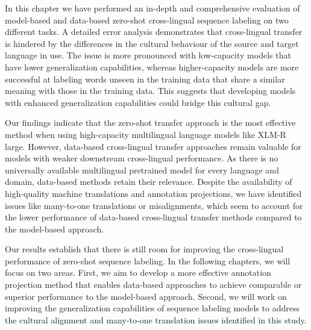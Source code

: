 In this chapter we have performed an in-depth and comprehensive evaluation of model-based and data-based zero-shot cross-lingual sequence labeling on two different tasks. A detailed error analysis demonstrates that cross-lingual transfer is hindered by the differences in the cultural behaviour of the source and target language in use. The issue is more pronounced with low-capacity models that have lower generalization capabilities, whereas higher-capacity models are more successful at labeling words unseen in the training data that share a similar meaning with those in the training data. This suggests that developing models with enhanced generalization capabilities could bridge this cultural gap.

Our findings indicate that the zero-shot transfer approach is the most effective method when using high-capacity multilingual language models like XLM-R large. However, data-based cross-lingual transfer approaches remain valuable for models with weaker downstream cross-lingual performance. As there is no universally available multilingual pretrained model for every language and domain, data-based methods retain their relevance. Despite the availability of high-quality machine translations and annotation projections, we have identified issues like many-to-one translations or misalignments, which seem to account for the lower performance of data-based cross-lingual transfer methods compared to the model-based approach.



Our results establish that there is still room for improving the cross-lingual performance of zero-shot sequence labeling. In the following chapters, we will focus on two areas. First, we aim to develop a more effective annotation projection method that enables data-based approaches to achieve comparable or superior performance to the model-based approach. Second, we will work on improving the generalization capabilities of sequence labeling models to address the cultural alignment and many-to-one translation issues identified in this study.

